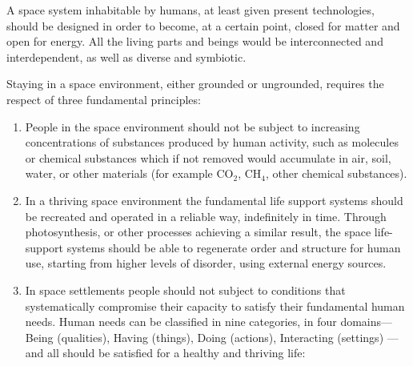 \documentclass[letter,11pt]{article}
\begin{document}
A space system inhabitable by humans, at least given present technologies,
should be designed in order to become, at a certain point, closed for matter
and open for energy. All the living parts and beings would be interconnected
and interdependent, as well as diverse and symbiotic.
 
Staying in a space environment, either grounded or ungrounded, requires the
respect of three fundamental principles: 
 
\begin{enumerate}

	\item     People in the space environment should not be subject to increasing
		concentrations of substances produced by human activity, such as molecules
		or chemical substances which if not removed would accumulate in air, soil,
		water, or other materials (for example CO$_2$, CH$_4$, other chemical
		substances).

	\item     In a thriving space environment the fundamental life support
		systems should be recreated and operated in a reliable way, indefinitely in
		time. Through photosynthesis, or other processes achieving a similar
		result, the space life-support systems should be able to regenerate order
		and structure for human use, starting from higher levels of disorder, using
		external energy sources.

 \item     In space settlements people should not subject to conditions that
	 systematically compromise their capacity to satisfy their fundamental human
	 needs. Human needs can be classified in nine categories, in four domains---%
	 Being (qualities), Having (things),  Doing (actions), Interacting (settings)%
	 ---and all should be satisfied for a healthy and thriving life:


\end{enumerate}
\end{document}
